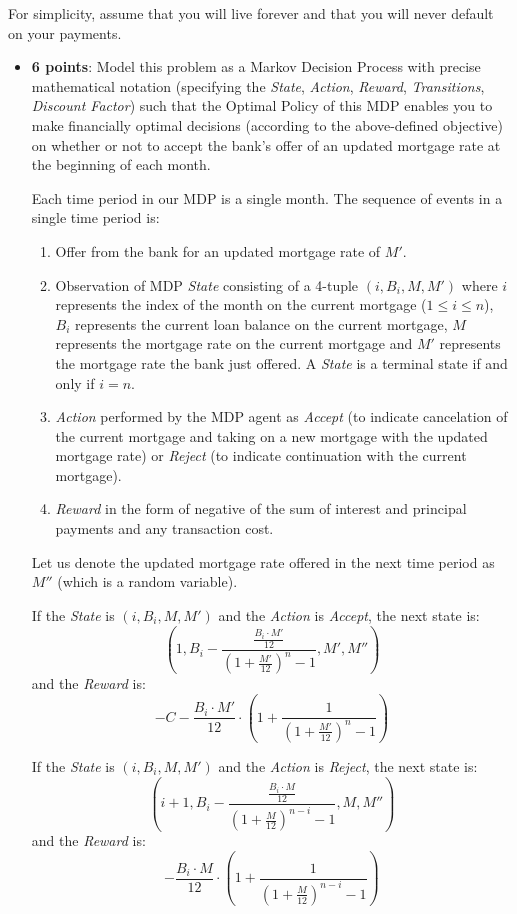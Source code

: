 \documentclass[12pt]{exam}
\begin{document}
\begin{questions}
For simplicity, assume that you will live forever and that you will never default on your payments.

\begin{itemize}
\item {\bf 6 points}: Model this problem as a Markov Decision Process with precise mathematical notation (specifying the {\em State}, {\em Action}, {\em Reward}, {\em Transitions}, {\em Discount Factor}) such that the Optimal Policy of this MDP enables you to make financially optimal decisions (according to the above-defined objective) on whether or not to accept the bank's offer of an updated mortgage rate at the beginning of each month.

\begin{solution}
Each time period in our MDP is a single month. The sequence of events in a single time period is:
\begin{enumerate}
    \item Offer from the bank for an updated mortgage rate of $M'$.
    \item Observation of MDP {\em State} consisting of a 4-tuple $(i, B_i, M, M')$ where $i$ represents the index of the month on the current mortgage ($1 \leq i \leq n$), $B_i$ represents the current loan balance on the current mortgage, $M$ represents the mortgage rate on the current mortgage and $M'$ represents the mortgage rate the bank just offered. A {\em State} is a terminal state if and only if $i = n$.
    \item {\em Action} performed by the MDP agent as {\em Accept} (to indicate cancelation of the current mortgage and taking on a new mortgage with the updated mortgage rate) or  {\em Reject} (to indicate continuation with the current mortgage).
    \item {\em Reward} in the form of negative of the sum of interest and principal payments and any transaction cost.
\end{enumerate}
Let us denote the updated mortgage rate offered in the next time period as $M''$ (which is a random variable).

 If the {\em State} is $(i, B_i, M, M')$ and the {\em Action} is {\em Accept}, the next state is:
 $$(1, B_i - \frac {\frac {B_i \cdot M'} {12}} {(1 + \frac {M'} {12})^n - 1}, M', M'')$$ and the {\em Reward} is:
 $$- C - \frac {B_i \cdot M'} {12} \cdot (1 + \frac 1 {(1 + \frac {M'} {12})^n - 1})$$
 
 If the {\em State} is $(i, B_i, M, M')$ and the {\em Action} is {\em Reject}, the next state is:
 $$(i+1, B_i - \frac {\frac {B_i \cdot M} {12}} {(1 + \frac M {12})^{n-i} - 1}, M, M'')$$ and the {\em Reward} is:
 $$- \frac {B_i \cdot M} {12} \cdot (1 + \frac 1 {(1 + \frac M {12})^{n-i} - 1})$$


\end{solution}
\end{itemize}
\end{questions}
\end{document}
